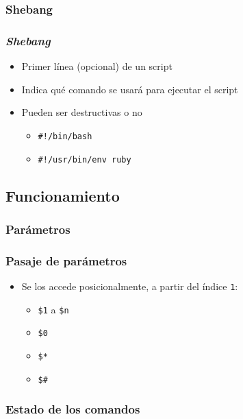 \subsubsection{Shebang}

\begin{frame}
  \frametitle{\textit{Shebang}}
  \begin{itemize}
    \item Primer línea (opcional) de un script
    \item Indica qué comando se usará para ejecutar el script
    \item Pueden ser destructivas o no
    \begin{itemize}
      \item \texttt{\#!/bin/bash}
      \item \texttt{\#!/usr/bin/env ruby}
    \end{itemize}
  \end{itemize}
\end{frame}

\subsection{Funcionamiento}

\subsubsection{Parámetros}

\begin{frame}
  \frametitle{Pasaje de parámetros}
  \begin{itemize}
    \item Se los accede posicionalmente, a partir del índice \texttt{1}:
    \begin{itemize}
      \item \texttt{\$1} a \texttt{\$n}
      \item \texttt{\$0}
      \item \texttt{\$*}
      \item \texttt{\$\#}
    \end{itemize}
  \end{itemize}
\end{frame}

\subsubsection{Estado de los comandos}

